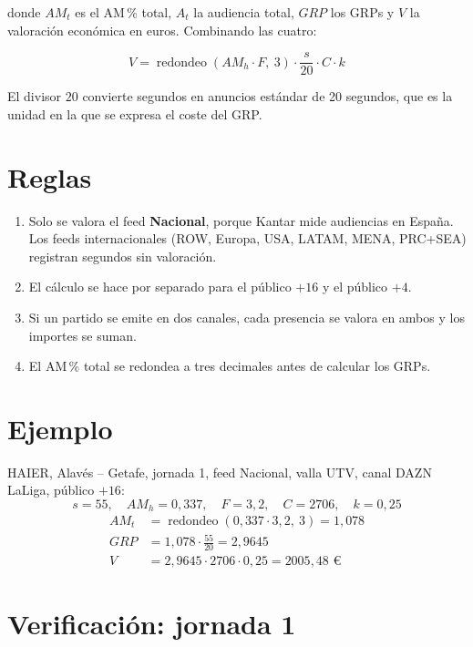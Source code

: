 \documentclass[11pt,a4paper]{article}
\begin{document}
donde $AM_t$ es el AM\,\% total, $A_t$ la audiencia total, $GRP$ los GRPs y $V$ la valoración económica en euros. Combinando las cuatro:

\[
V = \operatorname{redondeo}\left(AM_h \cdot F,\ 3\right) \cdot \frac{s}{20} \cdot C \cdot k
\]

El divisor $20$ convierte segundos en anuncios estándar de 20 segundos, que es la unidad en la que se expresa el coste del GRP.

\section*{Reglas}

\begin{enumerate}
  \item Solo se valora el feed \textbf{Nacional}, porque Kantar mide audiencias en España. Los feeds internacionales (ROW, Europa, USA, LATAM, MENA, PRC+SEA) registran segundos sin valoración.
  \item El cálculo se hace por separado para el público $+16$ y el público $+4$.
  \item Si un partido se emite en dos canales, cada presencia se valora en ambos y los importes se suman.
  \item El AM\,\% total se redondea a tres decimales antes de calcular los GRPs.
\end{enumerate}

\section*{Ejemplo}

HAIER, Alavés -- Getafe, jornada 1, feed Nacional, valla UTV, canal DAZN LaLiga, público $+16$:
\[
s = 55, \quad AM_h = 0{,}337, \quad F = 3{,}2, \quad C = 2706, \quad k = 0{,}25
\]
\begin{align*}
AM_t &= \operatorname{redondeo}(0{,}337 \cdot 3{,}2,\ 3) = 1{,}078 \\
GRP  &= 1{,}078 \cdot \tfrac{55}{20} = 2{,}9645 \\
V    &= 2{,}9645 \cdot 2706 \cdot 0{,}25 = 2005{,}48 \text{ €}
\end{align*}

\section*{Verificación: jornada 1}
\end{document}
